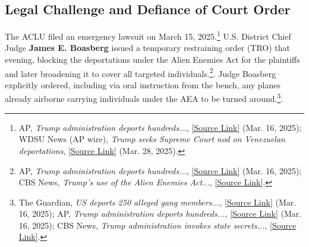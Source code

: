 \documentclass[11pt, letterpaper]{article}
\begin{document}
\subsection*{Legal Challenge and Defiance of Court Order}
The ACLU filed an emergency lawsuit on March 15, 2025.\footnote{AP, \emph{Trump administration deports hundreds...}, \href{https://apnews.com/article/trump-venezuela-el-salvador-immigration-dd4f61999f85c4dd8bcaba7d4fc7c9af\#:~:text=The\%20litigation\%20that\%20led\%20to,remove\%20them\%20from\%20the\%20country}{[Source Link]} (Mar. 16, 2025); WDSU News (AP wire), \emph{Trump seeks Supreme Court nod on Venezuelan deportations}, \href{https://www.wdsu.com/article/trump-supreme-court-venezuelan-deportations/64321685\#:~:text=organizations\%20and\%20risk\%20debilitating\%20effects,vowed\%20to\%20determine\%20whether\%20the}{[Source Link]} (Mar. 28, 2025).} U.S. District Chief Judge \textbf{James E. Boasberg} issued a temporary restraining order (TRO) that evening, blocking the deportations under the Alien Enemies Act for the plaintiffs and later broadening it to cover all targeted individuals.\footnote{AP, \emph{Trump administration deports hundreds...}, \href{https://apnews.com/article/trump-venezuela-el-salvador-immigration-dd4f61999f85c4dd8bcaba7d4fc7c9af\#:~:text=Boasberg\%20barred\%20those\%20Venezuelans\%E2\%80\%99\%20deportations,legal\%20authority\%20in\%20invoking\%20it}{[Source Link]} (Mar. 16, 2025); CBS News, \emph{Trump's use of the Alien Enemies Act...}, \href{https://www.cbsnews.com/news/trump-alien-enemies-act-of-1798-history/?intcid=CNR-01-0623\#:~:text=quickly\%20kicked\%20off\%20a\%20legal,battle}{[Source Link]}.}. Judge Boasberg explicitly ordered, including via oral instruction from the bench, any planes already airborne carrying individuals under the AEA to be turned around.\footnote{The Guardian, \emph{US deports 250 alleged gang members...}, \href{https://www.theguardian.com/us-news/2025/mar/16/deportation-alleged-gang-members-el-salvador\#:~:text=The\%20US\%20district\%20judge\%20James,to\%20return\%20to\%20the\%20US}{[Source Link]} (Mar. 16, 2025); AP, \emph{Trump administration deports hundreds...}, \href{https://apnews.com/article/trump-venezuela-el-salvador-immigration-dd4f61999f85c4dd8bcaba7d4fc7c9af\#:~:text=He\%20said\%20he\%20had\%20to,their\%20pleas\%20heard\%20in\%20court}{[Source Link]} (Mar. 16, 2025); CBS News, \emph{Trump administration invokes state secrets...}, \href{https://www.cbsnews.com/colorado/news/trump-state-secrets-privilege-deportations-alien-enemies-act/?intcid=CNR-01-0623\#:~:text=U,administration\%20and\%20the\%20federal\%20courts}{[Source Link]}.}.
\end{document}
